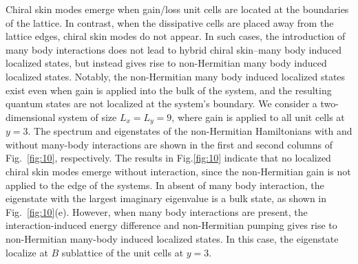 \documentclass[longbibliography, aps, prx, amsmath, amssymb, amsfonts, twocolumn,superscriptaddress, footinbib]{revtex4-1}
\begin{document}
	Chiral skin modes emerge when gain/loss unit cells are located at the boundaries of the lattice. 
	In contrast, when the dissipative cells are placed away from the lattice edges, chiral skin modes do not appear. In such cases, the introduction of many body interactions does not lead to hybrid chiral skin–many body induced localized states, but instead gives rise to non-Hermitian many body induced localized states. 
	Notably, the non-Hermitian many body induced localized states exist even when gain is applied into the bulk of the system, and the resulting quantum states are not localized at the system's boundary.
	We consider a two-dimensional system of size $L_x = L_y = 9$, where gain is applied to all unit cells at $y = 3$. 
	The spectrum and eigenstates of the non-Hermitian Hamiltonians with and without many-body interactions are shown in the first and second columns of Fig.~\ref{fig:10}, respectively. 
	The results in Fig.\ref{fig:10} indicate that no localized chiral skin modes emerge without interaction, since the non-Hermitian gain is not applied to the edge of the systems. 
	In absent of many body interaction, the eigenstate with the largest imaginary eigenvalue is a bulk state, as shown in Fig.~\ref{fig:10}(e). However, when many body interactions are present, the interaction-induced energy difference and non-Hermitian pumping gives rise to non-Hermitian many-body induced localized states. In this case, the eigenstate localize at $B$ sublattice of the unit cells at $y = 3$.
\end{document}
